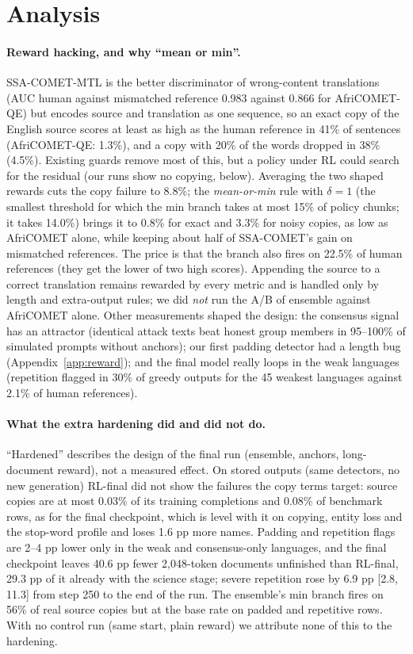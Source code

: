 \section{Analysis}\label{sec:analysis}
\paragraph{Reward hacking, and why ``mean or min''.} SSA-COMET-MTL is the better discriminator of wrong-content translations (AUC human against mismatched reference 0.983 against 0.866 for AfriCOMET-QE) but encodes source and translation as one sequence, so an exact copy of the English source scores at least as high as the human reference in 41\% of sentences (AfriCOMET-QE: 1.3\%), and a copy with 20\% of the words dropped in 38\% (4.5\%). Existing guards remove most of this, but a policy under RL could search for the residual (our runs show no copying, below). Averaging the two shaped rewards cuts the copy failure to 8.8\%; the \emph{mean-or-min} rule with $\delta=1$ (the smallest threshold for which the min branch takes at most 15\% of policy chunks; it takes 14.0\%) brings it to 0.8\% for exact and 3.3\% for noisy copies, as low as AfriCOMET alone, while keeping about half of SSA-COMET's gain on mismatched references. The price is that the branch also fires on 22.5\% of human references (they get the lower of two high scores). Appending the source to a correct translation remains rewarded by every metric and is handled only by length and extra-output rules; we did \emph{not} run the A/B of ensemble against AfriCOMET alone.
Other measurements shaped the design: the consensus signal has an attractor (identical attack texts beat honest group members in 95--100\% of simulated prompts without anchors); our first padding detector had a length bug (Appendix~\ref{app:reward}); and the final model really loops in the weak languages (repetition flagged in 30\% of greedy outputs for the 45 weakest languages against 2.1\% of human references).

\paragraph{What the extra hardening did and did not do.} ``Hardened'' describes the design of the final run (ensemble, anchors, long-document reward), not a measured effect. On stored outputs (same detectors, no new generation) RL-final did not show the failures the copy terms target: source copies are at most 0.03\% of its training completions and 0.08\% of benchmark rows, as for the final checkpoint, which is level with it on copying, entity loss and the stop-word profile and loses 1.6 pp more names. Padding and repetition flags are 2--4 pp lower only in the weak and consensus-only languages, and the final checkpoint leaves 40.6 pp fewer 2,048-token documents unfinished than RL-final, 29.3 pp of it already with the science stage; severe repetition rose by 6.9 pp [2.8, 11.3] from step 250 to the end of the run. The ensemble's min branch fires on 56\% of real source copies but at the base rate on padded and repetitive rows. With no control run (same start, plain reward) we attribute none of this to the hardening.

